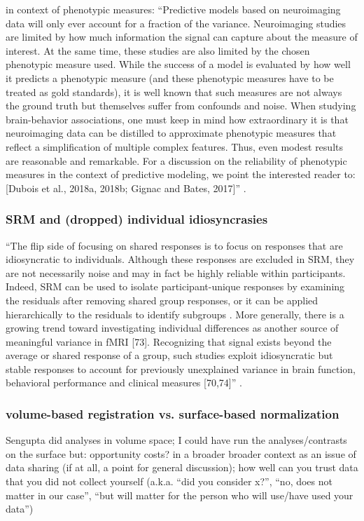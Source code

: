 \citet{scheinost2019ten} in context of phenotypic measures: ``Predictive models
based on neuroimaging data will only ever account for a fraction of the
variance. Neuroimaging studies are limited by how much information the signal
can capture about the measure of interest. At the same time, these studies are
also limited by the chosen phenotypic measure used.  While the success of a
model is evaluated by how well it predicts a phenotypic measure (and these
phenotypic measures have to be treated as gold standards), it is well known that
such measures are not always the ground truth but themselves suffer from
confounds and noise.  When studying brain-behavior associations, one must keep
in mind how extraordinary it is that neuroimaging data can be distilled to
approximate phenotypic measures that reflect a simplification of multiple
complex features. Thus, even modest results are reasonable and remarkable. For
a discussion on the reliability of phenotypic measures in the context of
predictive modeling, we point the interested reader to: [Dubois et al., 2018a,
2018b; Gignac and Bates, 2017]'' \citep{scheinost2019ten}.


\subsubsection{SRM and (dropped) individual idiosyncrasies}

``The flip side of focusing on shared responses is to focus on responses that
are idiosyncratic to individuals.
%
Although these responses are excluded in SRM, they are not necessarily noise and
may in fact be highly reliable within participants.
%
Indeed, SRM can be used to isolate participant-unique responses by examining the
residuals after removing shared group responses, or it can be applied
hierarchically to the residuals to identify subgroups \citep{chen2017shared}
\citep{cohen2017computational}.
%
More generally, there is a growing trend toward investigating individual
differences as another source of meaningful variance in fMRI [73].
%
Recognizing that signal exists beyond the average or shared response of a group,
such studies exploit idiosyncratic but stable responses to account for
previously unexplained variance in brain function, behavioral performance and
clinical measures [70,74]'' \citep{cohen2017computational}.


\subsubsection{volume-based registration vs. surface-based normalization}
%
Sengupta did analyses in volume space;
%
I could have run the analyses/contrasts on the surface
%
but: opportunity costs?
%
in a broader broader context as an issue of data sharing (if at all, a point for
general discussion); how well can you trust data that you did not collect
yourself (a.k.a. ``did you consider x?'', ``no, does not matter in our case'',
``but will matter for the person who will use/have used your data'')



